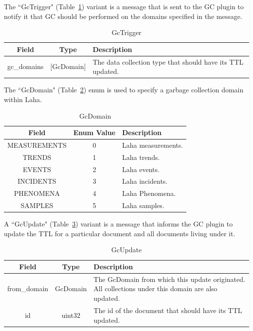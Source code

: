 The ``GcTrigger" (Table~\ref{table:GcTrigger}) variant is a message that is sent to the GC plugin to notify it that GC should be performed on the domains specified in the message.

\begin{table}[H]
	\centering
	\caption{GcTrigger}
	\begin{tabular}{|c|c|p{8cm}|}
		\hline
		Field & Type & Description  \\
		\hline
		gc\_domains & [GcDomain] & The data collection type that should have its TTL updated.  \\
		\hline
	\end{tabular}
	\label{table:GcTrigger}
\end{table}

The ``GcDomain" (Table~\ref{table:GcDomain}) enum is used to specify a garbage collection domain within Laha.

\begin{table}[H]
	\centering
	\caption{GcDomain}
	\begin{tabular}{|c|c| p{8cm} |}
		\hline
		Field & Enum Value & Description  \\
		\hline
		MEASUREMENTS & 0 & Laha measurements.  \\
		\hline
		TRENDS & 1 & Laha trends. \\
		\hline
		EVENTS & 2 & Laha events. \\
		\hline
		INCIDENTS & 3 & Laha incidents. \\
		\hline
		PHENOMENA & 4 & Laha Phenomena. \\
		\hline
		SAMPLES & 5 & Laha samples. \\
		\hline
	\end{tabular}
	\label{table:GcDomain}
\end{table}

A ``GcUpdate" (Table~\ref{table:GcUpdate}) variant is a message that informs the GC plugin to update the TTL for a particular document and all documents living under it.

\begin{table}[H]
	\centering
	\caption{GcUpdate}
	\begin{tabular}{|c|c|p{8cm}|}
		\hline
		Field & Type & Description  \\
		\hline
		from\_domain & GcDomain & The GcDomain from which this update originated. All collections under this domain are also updated.  \\
		\hline
		id & uint32 & The id of the document that should have its TTL updated. \\
		\hline
	\end{tabular}
	\label{table:GcUpdate}
\end{table}


